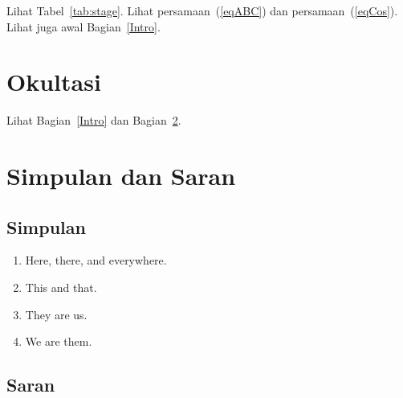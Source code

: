 \documentclass{book}
\begin{document}
    \lipsum[2] Lihat Tabel~\ref{tab:stage}. Lihat persamaan~(\ref{eqABC}) dan persamaan~(\ref{eqCos}). Lihat juga awal Bagian~\ref{Intro}. %

    \chapter{Okultasi} %
    \label{Okult}
    \lipsum[1-3] Lihat Bagian~\ref{Intro} dan Bagian~\ref{CnclSg}.


    \chapter{Simpulan dan Saran} %
    \label{CnclSg}

    \section{Simpulan}
    \label{Cncl}

    \begin{enumerate}
        \item Here, there, and everywhere.
        \item This and that.
        \item They are us.
        \item We are them.
    \end{enumerate}

    \section*{Saran}
    \label{Sg}      %
\end{document}
